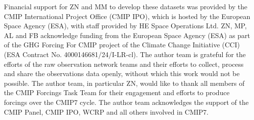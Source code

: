 Financial support for ZN and MM to develop these datasets was provided by the CMIP International Project Office (CMIP IPO), which is hosted by the European Space Agency (ESA), with staff provided by HE Space Operations Ltd.
ZN, MP, AL and FB acknowledge funding from the European Space Agency (ESA) as part of the GHG Forcing For CMIP project of the Climate Change Initiative (CCI) (ESA Contract No. 4000146681/24/I-LR-cl).
The author team is grateful for the efforts of the raw observation network teams and their efforts to collect, process and share the observations data openly, without which this work would not be possible.
The author team, in particular ZN, would like to thank all members of the CMIP Forcings Task Team for their engagement and efforts to produce forcings over the CMIP7 cycle.
The author team acknowledges the support of the CMIP Panel, CMIP IPO, WCRP and all others involved in CMIP7.
